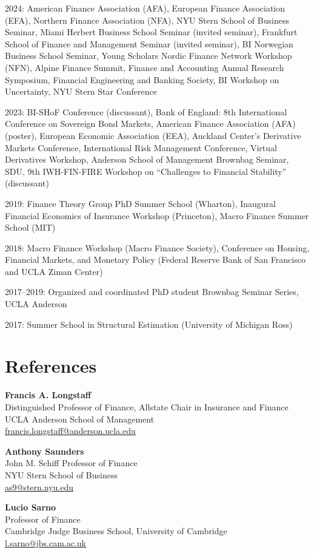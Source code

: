 \documentclass[11pt]{article}
\begin{document}
2024: American Finance Association (AFA), European Finance Association (EFA), Northern Finance Association (NFA), NYU Stern School of Business Seminar, Miami Herbert Business School Seminar (invited seminar), Frankfurt School of Finance and Management Seminar (invited seminar), BI Norwegian Business School Seminar, Young Scholars Nordic Finance Network Workshop (NFN), Alpine Finance Summit, Finance and Accounting Annual Research Symposium, Financial Engineering and Banking Society, BI Workshop on Uncertainty, NYU Stern Star Conference

2023: BI-SHoF Conference (discussant), Bank of England: 8th International Conference on Sovereign Bond Markets, American Finance Association (AFA) (poster), European Economic Association (EEA), Auckland Center's Derivative Markets Conference, International Risk Management Conference, Virtual Derivatives Workshop, Anderson School of Management Brownbag Seminar, SDU, 9th IWH-FIN-FIRE Workshop on ``Challenges to Financial Stability'' (discussant)

2019: Finance Theory Group PhD Summer School (Wharton), Inaugural Financial Economics of Insurance Workshop (Princeton), Macro Finance Summer School (MIT)

2018: Macro Finance Workshop (Macro Finance Society), Conference on Housing, Financial Markets, and Monetary Policy (Federal Reserve Bank of San Francisco and UCLA Ziman Center)

2017--2019: Organized and coordinated PhD student Brownbag Seminar Series, UCLA Anderson

2017: Summer School in Structural Estimation (University of Michigan Ross)

\section{References}
\textbf{Francis A. Longstaff}\\
Distinguished Professor of Finance, Allstate Chair in Insurance and Finance\\
UCLA Anderson School of Management\\
\href{mailto:francis.longstaff@anderson.ucla.edu}{francis.longstaff@anderson.ucla.edu}

\medskip
\textbf{Anthony Saunders}\\
John M. Schiff Professor of Finance\\
NYU Stern School of Business\\
\href{mailto:as9@stern.nyu.edu}{as9@stern.nyu.edu}

\medskip
\textbf{Lucio Sarno}\\
Professor of Finance\\
Cambridge Judge Business School, University of Cambridge\\
\href{mailto:l.sarno@jbs.cam.ac.uk}{l.sarno@jbs.cam.ac.uk}
\end{document}
